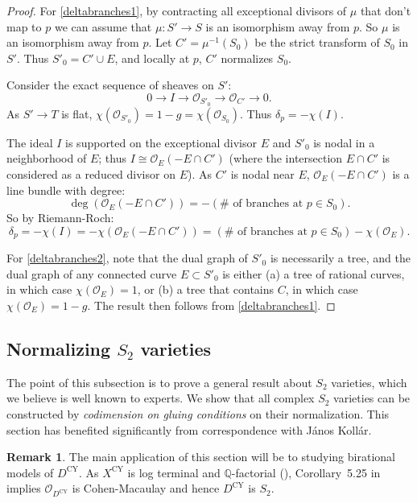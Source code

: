 \documentclass[JEP,XML,SOM,Unicode,NoFloatCountersInSection,published]{cedram}
\theoremstyle{plain}
\theoremstyle{definition}
\newtheorem{remark}[theorem]{Remark}
\newcommand\QQ{{\mathbb Q}}
\newcommand\Oc{{\mathcal O}}
\newcommand\Dcy{{D^{\mathrm{CY}}}}
\newcommand\Xcy{{X^{\mathrm{CY}}}}
\newcommand\cl{{\colon}}
\begin{document}
\begin{proof}
For \eqref{deltabranches1}, by contracting all exceptional divisors of $\mu$ that don't map to $p$ we can assume that $\mu\cl S'\to S$ is an isomorphism away from $p$. So $\mu$ is an isomorphism away from $p$. Let $C'=\mu^{-1}(S_0)$ be the strict transform of $S_0$ in $S'$. Thus $S'_0 = C'\cup E$, and locally at $p$, $C'$ normalizes $S_0$.

Consider the exact sequence of sheaves on $S'$:
\[
0\to I \to \Oc_{S'_0} \to \Oc_{C'}\to 0.
\]
As $S'\to T$ is flat, $\chi(\Oc_{S'_0})=1-g=\chi(\Oc_{S_0})$. Thus $\delta_p = -\chi(I)$.

The ideal $I$ is supported on the exceptional divisor $E$ and $S'_0$ is nodal in a neighborhood of $E$; thus $I\cong \Oc_E(-E\cap C')$ (where the intersection $E\cap C'$ is considered as a reduced divisor on $E$). As $C'$ is nodal near $E$, $\Oc_E(-E\cap C')$ is a line bundle with degree:
\[
\deg(\Oc_E(-E\cap C')) = -(\#\text{ of branches at }p\in S_0).
\]
So by Riemann-Roch:
\[
\delta_p = -\chi(I) = -\chi(\Oc_E(-E\cap C')) = (\#\text{ of branches at }p\in S_0) - \chi(\Oc_E).
\]

For \eqref{deltabranches2}, note that the dual graph of $S'_0$ is necessarily a tree, and the dual graph of any connected curve $E\subset S'_0$ is either (a) a tree of rational curves, in which case $\chi(\Oc_E) = 1$, or (b) a tree that contains $C$, in which case $\chi(\Oc_E) = 1-g$. The result then follows from \eqref{deltabranches1}.
\end{proof}

\subsection{Normalizing $S_2$ varieties}

The point of this subsection is to prove a general result about $S_2$ varieties, which we believe is well known to experts. We show that all complex $S_2$ varieties can be constructed by \textit{codimension on gluing conditions} on their normalization. This section has benefited significantly from correspondence with János Kollár.

\begin{remark}\label{DcyisS2}
The main application of this section will be to studying birational models of $\Dcy$. As $\Xcy$ is log terminal and $\QQ$-factorial (\cite[Lem.\,2.11]{Hacking}), Corollary~5.25 in \cite{KollarMori} implies $\Oc_\Dcy$ is Cohen-Macaulay and hence $\Dcy$ is $S_2$.
\end{remark}
\end{document}
